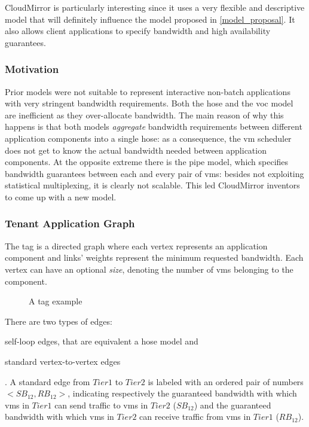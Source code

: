 CloudMirror \cite{cloudmirror} is particularly interesting since it uses a very flexible and descriptive \gls{model} that will definitely influence the model proposed in \autoref{model_proposal}.
It also allows client applications to specify bandwidth and high availability guarantees.

\subsubsection{Motivation} \label{why_tag}
Prior \glspl{model} were not suitable to represent interactive non-batch applications with very stringent bandwidth requirements.
Both the hose and the \gls{voc} model are inefficient as they over-allocate bandwidth.
The main reason of why this happens is that both models \textit{aggregate} bandwidth requirements between different application components into a single hose: as a consequence, the \gls{vm} scheduler does not get to know the actual bandwidth needed between application components.
At the opposite extreme there is the pipe model, which specifies bandwidth guarantees between each and every pair of \glspl{vm}: besides not exploiting statistical multiplexing, it is clearly not scalable.
This led CloudMirror \cite{cloudmirror} inventors to come up with a new model.

\subsubsection{Tenant Application Graph} \label{tag_description}
The \gls{tag} is a directed graph where each vertex represents an application component and links' weights represent the minimum requested bandwidth.
Each vertex can have an optional \textit{size}, denoting the number of \glspl{vm} belonging to the component.

\begin{figure}[!htb]
    \centering
    \usebox{\tagfigure}
    \caption{A \gls{tag} example}
\end{figure}

There are two types of edges:
\begin{mylist}
    \item self-loop edges, that are equivalent a hose model and
    \item standard vertex-to-vertex edges
\end{mylist}.
A standard edge from $Tier 1$ to $Tier 2$ is labeled with an ordered pair of numbers $<SB_{12}, RB_{12}>$, indicating respectively the guaranteed bandwidth with which \glspl{vm} in $Tier 1$ can send traffic to \glspl{vm} in $Tier 2$ ($SB_{12}$) and the guaranteed bandwidth with which \glspl{vm} in $Tier 2$ can receive traffic from \glspl{vm} in $Tier 1$ ($RB_{12}$).

